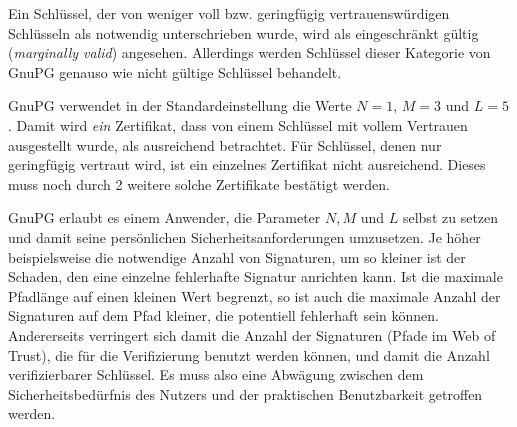 Ein Schlüssel, der von weniger voll bzw. geringfügig
vertrauenswürdigen Schlüsseln als notwendig unterschrieben wurde, wird
als eingeschränkt gültig (\emph{marginally valid})
angesehen. Allerdings werden Schlüssel dieser Kategorie von GnuPG
genauso wie nicht gültige Schlüssel behandelt.

GnuPG verwendet in der Standardeinstellung die Werte $N=1$, $M=3$ und
$L=5$. Damit wird \emph{ein} Zertifikat, dass von einem Schl\"ussel
mit vollem Vertrauen ausgestellt wurde, als ausreichend
betrachtet. F\"ur Schl\"ussel, denen nur geringf\"ugig vertraut wird,
ist ein einzelnes Zertifikat nicht ausreichend. Dieses muss noch durch
2 weitere solche Zertifikate best\"atigt werden. 

GnuPG erlaubt es einem Anwender, die Parameter $N, M$ und $L$ selbst
zu setzen und damit seine pers\"onlichen Sicherheitsanforderungen
umzusetzen. Je höher beispielsweise die notwendige Anzahl von
Signaturen, um so kleiner ist der Schaden, den eine einzelne
fehlerhafte Signatur anrichten kann. Ist die maximale Pfadlänge auf
einen kleinen Wert begrenzt, so ist auch die maximale Anzahl der
Signaturen auf dem Pfad kleiner, die potentiell fehlerhaft sein
können. Andererseits verringert sich damit die Anzahl der Signaturen
(Pfade im Web of Trust), die für die Verifizierung benutzt werden
können, und damit die Anzahl verifizierbarer Schlüssel. Es muss also
eine Abwägung zwischen dem Sicherheitsbedürfnis des Nutzers und der
praktischen Benutzbarkeit getroffen werden.

